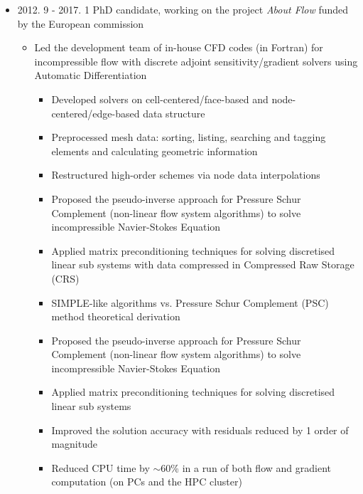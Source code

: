 \documentclass[letterpaper]{article}
\begin{document}
\begin{itemize}
\item 2012. 9 - 2017. 1  \hspace{2pt} PhD candidate, working on the project \textsl{About Flow} funded by the European commission
		\begin{itemize}
		\item Led the development team of in-house CFD codes (in Fortran) for incompressible flow with discrete adjoint sensitivity/gradient solvers using Automatic Differentiation
		\begin{itemize}
		\item Developed solvers on cell-centered/face-based and node-centered/edge-based data structure
		\item Preprocessed mesh data: sorting, listing, searching and tagging elements and calculating geometric information
		\item Restructured high-order schemes via node data interpolations
		\item Proposed the pseudo-inverse approach for Pressure Schur Complement (non-linear flow system algorithms) to solve incompressible Navier-Stokes Equation
		\item Applied matrix preconditioning techniques for solving discretised linear sub systems with data compressed in Compressed Raw Storage (CRS)
%		
		\item	SIMPLE-like algorithms vs. Pressure Schur Complement (PSC) method theoretical derivation
		\item Proposed the pseudo-inverse approach for Pressure Schur Complement (non-linear flow system algorithms) to solve incompressible Navier-Stokes Equation
		\item Applied matrix preconditioning techniques for solving discretised linear sub systems
		\item Improved the solution accuracy with residuals reduced by 1 order of magnitude
		\item Reduced CPU time by $\sim$60\% in a run of both flow and gradient computation (on PCs and the HPC cluster)

\end{itemize}
\end{itemize}
\end{itemize}
\end{document}
